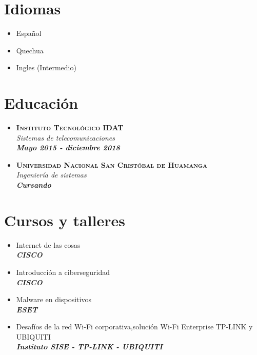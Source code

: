 \documentclass[11pt, oneside, a4paper, titlepage]{article}
\begin{document}
\begin{tcolorbox}
\begin{minipage}[t]{8cm}
\begin{tcolorbox}[grow to left by=0.6cm, colback=gray!15, colframe=white]
\begin{itemize}
				\end{itemize}
				
				\section*{Idiomas}
				
				\begin{itemize}
					\item Español
					\item Quechua
					\item Ingles (Intermedio)
				\end{itemize}
			\end{tcolorbox}
		\end{minipage}
		\begin{minipage}[t]{11cm}
			\vspace{-0.5cm}
			\begin{tcolorbox}[grow to right by=0.75cm, colframe=white, colback=white]
				\section*{Educación}
				\begin{itemize}
					\item \textbf{\textsc{Instituto Tecnológico IDAT}}\\
					\emph{Sistemas de telecomunicaciones}\\
					\emph{\textbf{Mayo 2015 - diciembre 2018}}
					\item \textbf{\textsc{Universidad Nacional San Cristóbal de Huamanga}}\\
					\emph{Ingeniería de sistemas}\\
					\emph{\textbf{Cursando}}
				\end{itemize}
				\section*{Cursos y talleres}
				\begin{itemize}
					\item Internet de las cosas\\
					\emph{\textbf{CISCO}}
					\item Introducción a ciberseguridad \\
					\emph{\textbf{CISCO}}
					\item Malware en dispositivos \\
					\emph{\textbf{ESET}}
					\item Desafíos de la red Wi-Fi corporativa,solución Wi-Fi Enterprise TP-LINK y UBIQUITI\\
					\emph{\textbf{Instituto SISE - TP-LINK - UBIQUITI}}
				\end{itemize}

\end{tcolorbox}
\end{minipage}
\end{tcolorbox}
\end{document}
